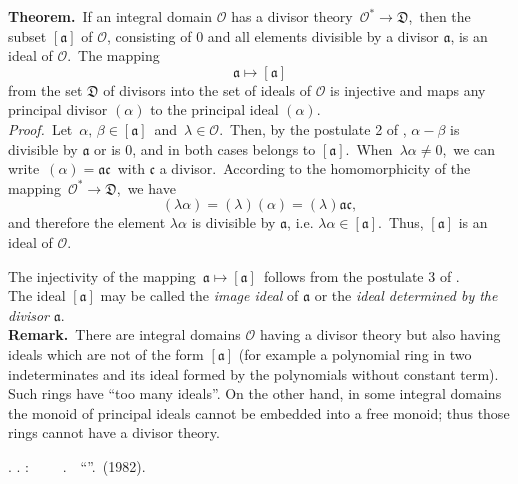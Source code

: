 \documentclass[12pt]{article}
\theoremstyle{definition}
\begin{document}
\textbf{Theorem.}\, If an integral domain $\mathcal{O}$ has a divisor theory \,$\mathcal{O}^* \to \mathfrak{D}$,\, then the subset $[\mathfrak{a}]$ of $\mathcal{O}$, consisting of 0 and all elements divisible by a divisor $\mathfrak{a}$, is an ideal of $\mathcal{O}$.\, The mapping
$$\mathfrak{a} \mapsto [\mathfrak{a}]$$
from the set $\mathfrak{D}$ of divisors into the set of ideals of $\mathcal{O}$ is injective and maps any principal divisor $(\alpha)$ to the principal ideal $(\alpha)$.\\

{\em Proof.}\, Let\, $\alpha,\,\beta \in [\mathfrak{a}]$\, and\, $\lambda \in \mathcal{O}$.\, Then, by the postulate 2 of , $\alpha\!-\!\beta$ is divisible by $\mathfrak{a}$ or is 0, and in both cases belongs to $[\mathfrak{a}]$.\, When\, $\lambda\alpha \neq 0$,\, we can write\, $(\alpha) = \mathfrak{ac}$\, with $\mathfrak{c}$ a divisor.\, According to the homomorphicity of the mapping \,$\mathcal{O}^* \to \mathfrak{D}$,\, we have
$$(\lambda\alpha) = (\lambda)(\alpha) = (\lambda)\mathfrak{ac},$$
and therefore the element $\lambda\alpha$ is divisible by $\mathfrak{a}$, i.e. $\lambda\alpha \in [\mathfrak{a}]$.\, Thus, $[\mathfrak{a}]$ is an ideal of $\mathcal{O}$.

The injectivity of the mapping\, $\mathfrak{a} \mapsto [\mathfrak{a}]$\, follows from the postulate 3 of .\\



The ideal $[\mathfrak{a}]$ may be called the {\em image ideal} of $\mathfrak{a}$ or the {\em ideal determined by the divisor} $\mathfrak{a}$.\\

\textbf{Remark.}\, There are integral domains $\mathcal{O}$ having a divisor theory but also having ideals which are not of the form $[\mathfrak{a}]$ (for example a polynomial ring in two indeterminates and its ideal formed by the polynomials without constant term).\, Such rings have ``too many ideals''.\; On the other hand, in some integral domains the monoid of principal ideals cannot be embedded into a free monoid; thus those rings cannot have a divisor theory.

\begin{thebibliography}{9}
 \CYRM. \CYRM. \CYRP\cyro\cyrs\cyrt\cyrn\cyri\cyrk\cyro\cyrv: 
{\em \CYRV\cyrv\cyre\cyrd\cyre\cyrn\cyri\cyre\, \cyrv\, \cyrt\cyre\cyro\cyrr\cyri\cyryu\, \cyra\cyrl\cyrg\cyre\cyrb\cyrr\cyra\cyri\cyrch\cyre\cyrs\cyrk\cyri\cyrh \,
\cyrch\cyri\cyrs\cyre\cyrl}. \,\CYRI\cyrz\cyrd\cyra\cyrt\cyre\cyrl\cyrsftsn\cyrs\cyrt\cyrv\cyro \,
``\CYRN\cyra\cyru\cyrk\cyra''. \CYRM\cyro\cyrs\cyrk\cyrv\cyra \,(1982).
\end{thebibliography}

\end{document}

